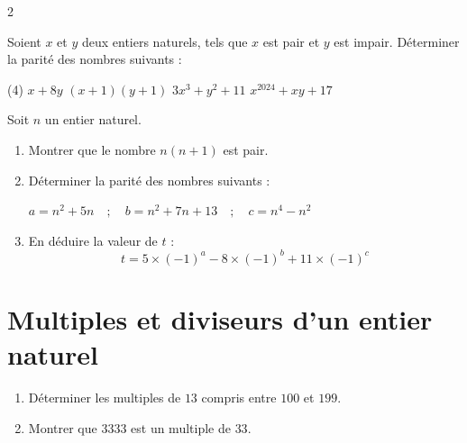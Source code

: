 \documentclass[10pt, a4paper]{article}
\begin{document}
\begin{multicols*}{2}
\begin{Application}[][15 min]
Soient $x$  et $y$ deux entiers naturels, tels que $x$ est pair et $y$ est impair. Déterminer la parité des nombres suivants :
\vspace{0.3cm}
\begin{center}
\begin{tasks}[label=$\bullet$, label-width=10pt, item-indent=25pt](4)
    \task $x + 8y$
    \task $(x + 1)(y + 1)$
    \task $3x^3 + y^2 + 11$
    \task $x^{2024} + xy + 17$
\end{tasks}
\end{center}
\end{Application}

\begin{Application}[][15 min]
Soit $n$ un entier naturel.
\begin{enumerate}[leftmargin=*,itemsep=0.5pt]
    \item Montrer que le nombre $n(n+1)$ est pair.
    \item Déterminer la parité des nombres suivants :
\begin{center}
$a=n^2+5n \quad ; \quad b=n^2+7n+13 \quad ; \quad c=n^4-n^2$
\end{center}
\item En déduire la valeur de $t$ :
\[  t=5\times(-1)^a-8\times(-1)^b+11\times(-1)^c \]
\end{enumerate}
\end{Application}


\section{Multiples et diviseurs d'un entier naturel}

\begin{Application}[][15 min]
\begin{enumerate}[leftmargin=*,itemsep=0.5pt]
    \item Déterminer les multiples de $13$ compris entre $100$ et $199$.
    \item Montrer que $3333$ est un multiple de $33$.
\end{enumerate}
\end{Application}


\end{multicols*}
\end{document}
